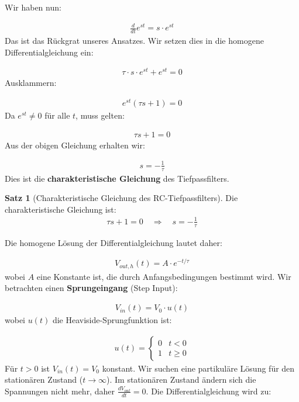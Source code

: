 \documentclass[a4paper, 12pt, twoside, openright]{report}
\theoremstyle{definition}
\theoremstyle{definition}
\newtheorem{satz}{Satz}[chapter]
\begin{document}
Wir haben nun:

\begin{align}
	\frac{d}{dt} e^{st} = s \cdot e^{st}
\end{align}
Das ist das Rückgrat unseres Ansatzes. Wir setzen dies in die homogene Differentialgleichung ein:

\begin{align}
	\tau \cdot s \cdot e^{st} + e^{st} = 0
\end{align}
Ausklammern:

\begin{align}
	e^{st} (\tau s + 1) = 0
\end{align}
Da $e^{st} \neq 0$ für alle $t$, muss gelten:

\begin{align}
	\tau s + 1 = 0
\end{align}
Aus der obigen Gleichung erhalten wir:

\begin{align}
	s = -\frac{1}{\tau}
\end{align}
Dies ist die \textbf{charakteristische Gleichung} des Tiefpassfilters.

\begin{satz}[Charakteristische Gleichung des RC-Tiefpassfilters]
	Die charakteristische Gleichung ist:
	\begin{align}
		\tau s + 1 = 0 \quad \Rightarrow \quad s = -\frac{1}{\tau}
	\end{align}
\end{satz}
Die homogene Lösung der Differentialgleichung lautet daher:

\begin{align}
	V_{out,h}(t) = A \cdot e^{-t/\tau}
\end{align}
wobei $A$ eine Konstante ist, die durch Anfangsbedingungen bestimmt wird. Wir betrachten einen \textbf{Sprungeingang} (Step Input):

\begin{align}
	V_{in}(t) = V_0 \cdot u(t)
\end{align}
wobei $u(t)$ die Heaviside-Sprungfunktion ist:

\begin{align}
	u(t) = \begin{cases} 0 & t < 0 \\ 1 & t \geq 0 \end{cases}
\end{align}
Für $t > 0$ ist $V_{in}(t) = V_0$ konstant. Wir suchen eine partikuläre Lösung für den stationären Zustand ($t \to \infty$). 
Im stationären Zustand ändern sich die Spannungen nicht mehr, daher $\frac{dV_{out}}{dt} = 0$. Die Differentialgleichung wird zu:
\end{document}
